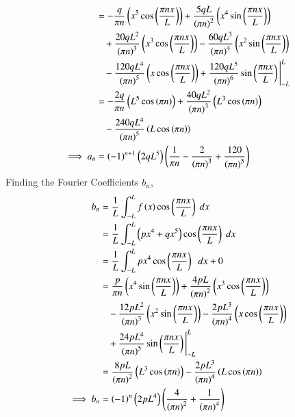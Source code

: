 \documentclass[journal,12pt,twocolumn]{IEEEtran}
\theoremstyle{remark}
\begin{document}
\begin{align}
    &=-\frac{q}{\pi n}\left(x^5\cos\left(\frac{\pi n x}{L}\right)\right)+\frac{5qL}{\left(\pi n\right)^2}\left(x^4\sin\left(\frac{\pi n x}{L}\right)\right)\notag\\
    &\;\;\;+\frac{20qL^2}{\left(\pi n\right)^3}\left(x^3\cos\left(\frac{\pi n x}{L}\right)\right)-\frac{60qL^3}{\left(\pi n \right)^4}\left(x^2\sin\left(\frac{\pi n x}{L}\right)\right)\notag\\
    &\;\;\;-\frac{120qL^4}{\left(\pi n\right)^5}\left(x\cos\left(\frac{\pi n x}{L}\right)\right)+\frac{120qL^5}{\left(\pi n\right)^6}\sin\left(\frac{\pi n x}{L}\right)\Bigg|_{-L}^{L}\\
    &=-\frac{2q}{\pi n}\left(L^5\cos\left(\pi n \right)\right)+\frac{40qL^2}{\left(\pi n\right)^3}\left(L^3\cos\left(\pi n \right)\right)\notag\\
    &\;\;\;-\frac{240qL^4}{\left(\pi n\right)^5}\left(L\cos\left(\pi n\right)\right)\\
    \implies a_n&=\left(-1\right)^{n+1}\left(2qL^5\right)\left(\frac{1}{\pi n}-\frac{2}{\left(\pi n\right)^3}+\frac{120}{\left(\pi n\right)^5}\right)
\end{align}
Finding the Fourier Coefficients $b_n$,
\begin{align}
    b_n&=\frac{1}{L}\int_{-L}^{L}f\left(x\right) \cos\left(\frac{\pi n x}{L}\right)\;dx\\
    &=\frac{1}{L}\int_{-L}^{L}\left(px^4+qx^5\right)\cos\left(\frac{\pi n x}{L}\right)\;dx\\
    &=\frac{1}{L}\int_{-L}^{L}px^4\cos\left(\frac{\pi n x}{L}\right)\;\;dx+0\\
    &=\frac{p}{\pi n}\left(x^4\sin\left(\frac{\pi n x}{L}\right)\right)+\frac{4pL}{\left(\pi n\right)^2}\left(x^3\cos\left(\frac{\pi n x}{L}\right)\right)\notag\\
    &\;\;\;-\frac{12pL^2}{\left(\pi n\right)^3}\left(x^2\sin\left(\frac{\pi n x}{L}\right)\right)-\frac{2pL^3}{\left(\pi n\right)^4}\left(x\cos\left(\frac{\pi n x}{L}\right)\right)\notag\\
    &\;\;\;+\frac{24pL^4}{\left(\pi n \right)^5}\sin\left(\frac{\pi n x}{L}\right)\Bigg|_{-L}^{L}\\
    &=\frac{8pL}{\left(\pi n\right)^2}\left(L^3\cos\left(\pi n\right)\right)-\frac{2pL^3}{\left(\pi n\right)^4}\left(L\cos\left(\pi n\right)\right)\\
    \implies b_n&=\left(-1\right)^n\left(2pL^4\right)\left(\frac{4}{\left(\pi n\right)^2}+\frac{1}{\left(\pi n\right)^4}\right)
\end{align}
\end{document}
